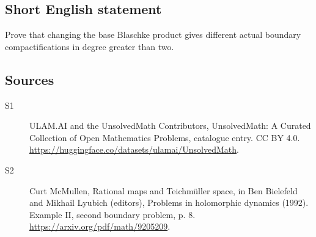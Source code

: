 \documentclass[11pt]{article}
\begin{document}
\subsection{Short English statement}
Prove that changing the base Blaschke product gives different actual boundary compactifications in degree greater than two.
\subsection{Sources}
\begin{description}
\item[\hypertarget{source:statement:1}{S1}] ULAM.AI and the UnsolvedMath Contributors, UnsolvedMath: A Curated Collection of Open Mathematics Problems, catalogue entry. CC BY 4.0. \url{https://huggingface.co/datasets/ulamai/UnsolvedMath}.
\item[\hypertarget{source:statement:2}{S2}] Curt McMullen, Rational maps and Teichmüller space, in Ben Bielefeld and Mikhail Lyubich (editors), Problems in holomorphic dynamics (1992). Example II, second boundary problem, p. 8. \url{https://arxiv.org/pdf/math/9205209}.
\end{description}
\label{end:statement}
\end{document}
